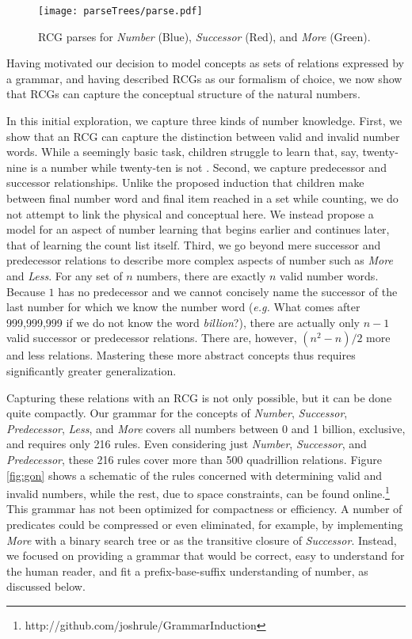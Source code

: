 \documentclass[10pt,letterpaper]{article}
\begin{document}
\begin{figure}[t]
  \begin{centering}
    \texttt{[image: parseTrees/parse.pdf]}
    \caption{RCG parses for \emph{Number} (Blue), \emph{Successor} (Red), and \emph{More} (Green).}
    \label{fig:parse}
  \end{centering}
\end{figure}

Having motivated our decision to model concepts as sets of relations
expressed by a grammar, and having described RCGs as our formalism of
choice, we now show that RCGs can capture the conceptual structure of
the natural numbers.

In this initial exploration, we capture three kinds of number
knowledge. First, we show that an RCG can capture the distinction
between valid and invalid number words. While a seemingly basic task,
children struggle to learn that, say, twenty-nine is a number while
twenty-ten is not \citep{FusRicBriar1982}. Second, we capture
predecessor and successor relationships. Unlike the proposed induction
that children make between final number word and final item reached in
a set while counting, we do not attempt to link the physical and
conceptual here. We instead propose a model for an aspect of number
learning that begins earlier and continues later, that of learning the
count list itself. Third, we go beyond mere successor and predecessor
relations to describe more complex aspects of number such as
\emph{More} and \emph{Less}. For any set of $n$ numbers, there are
exactly $n$ valid number words. Because $1$ has no predecessor and we
cannot concisely name the successor of the last number for which we
know the number word ({\it e.g.} What comes after 999,999,999 if we do
not know the word \emph{billion}?), there are actually only $n-1$
valid successor or predecessor relations. There are, however,
$(n^2-n)/2$ more and less relations. Mastering these more abstract
concepts thus requires significantly greater generalization.

Capturing these relations with an RCG is not only possible, but it can
be done quite compactly. Our grammar for the concepts of
\emph{Number}, \emph{Successor}, \emph{Predecessor}, \emph{Less}, and
\emph{More} covers all numbers between 0 and 1 billion, exclusive, and
requires only 216 rules. Even considering just \emph{Number},
\emph{Successor}, and \emph{Predecessor}, these 216 rules cover more
than 500 quadrillion relations. Figure \ref{fig:gon} shows a schematic
of the rules concerned with determining valid and invalid numbers,
while the rest, due to space constraints, can be found
online.\footnote{http://github.com/joshrule/GrammarInduction} This
grammar has not been optimized for compactness or efficiency. A number
of predicates could be compressed or even eliminated, for example, by
implementing \emph{More} with a binary search tree or as the
transitive closure of \emph{Successor}. Instead, we focused on
providing a grammar that would be correct, easy to understand for the
human reader, and fit a prefix-base-suffix understanding of number, as
discussed below.
\end{document}
